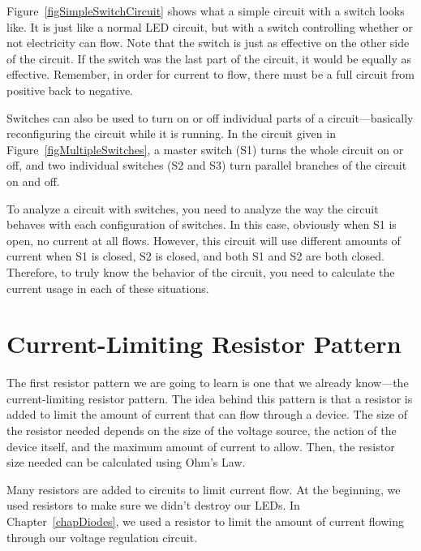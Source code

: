 
Figure~\ref{figSimpleSwitchCircuit} shows what a simple circuit with a switch looks like.
It is just like a normal LED circuit, but with a switch controlling whether or not electricity can flow.
Note that the switch is just as effective on the other side of the circuit.
If the switch was the last part of the circuit, it would be equally as effective.  
Remember, in order for current to flow, there must be a full circuit from positive back to negative.


Switches can also be used to turn on or off individual parts of a circuit---basically reconfiguring the circuit while it is running.
In the circuit given in Figure~\ref{figMultipleSwitches}, a master switch (S1) turns the whole circuit on or off, and two individual switches (S2 and S3) turn parallel branches of the circuit on and off.

To analyze a circuit with switches, you need to analyze the way the circuit behaves with each configuration of switches.  
In this case, obviously when S1 is open, no current at all flows.
However, this circuit will use different amounts of current when S1 is closed, S2 is closed, and both S1 and S2 are both closed.
Therefore, to truly know the behavior of the circuit, you need to calculate the current usage in each of these situations.

\section{Current-Limiting Resistor Pattern}

The first resistor pattern we are going to learn is one that we already know---the current-limiting resistor pattern.
The idea behind this pattern is that a resistor is added to limit the amount of current that can flow through a device.
The size of the resistor needed depends on the size of the voltage source, the action of the device itself, and the maximum amount of current to allow.
Then, the resistor size needed can be calculated using Ohm's Law.

Many resistors are added to circuits to limit current flow.
At the beginning, we used resistors to make sure we didn't destroy our LEDs.
In Chapter~\ref{chapDiodes}, we used a resistor to limit the amount of current flowing through our voltage regulation circuit.

